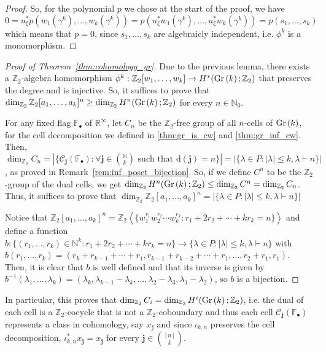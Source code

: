 \begin{proof}
So, for the polynomial $p$ we chose at the start of the proof, we have $0=u_{\xi}^*p(w_1(\gamma^k),\ldots,w_k(\gamma^k))=p(u^*_{\xi}w_1(\gamma^k),\ldots,u^*_{\xi}w_k(\gamma^k))=p(s_1,\ldots,s_k)$ which means that $p=0$, since $s_1,\ldots,s_k$ are algebraicly independent, i.e. $\phi^k$ is a monomorphism.
\end{proof}
\begin{proof}[Proof of Theorem~\ref{thm:cohomology_gr}] Due to the previous lemma, there exists a $\mathbb{Z}_2$-algebra homomorphism $\phi^k:\mathbb{Z}_2[w_1,\ldots,w_k]\to H^*(\Gr{k};\mathbb{Z}_2)$ that preserves the degree and is injective. So, it suffices to prove that $\dim_{\mathbb{Z}_2}\mathbb{Z}_2[a_1,\ldots,a_k]^n\geq\dim_{\mathbb{Z}_2}H^n(\Gr{k};\mathbb{Z}_2)$ for every $n\in\mathbb{N}_0$.

For any fixed flag $\mathbb{F}_{\bullet}$ of $\mathbb{R}^{\infty}$, let $C_n$ be the $\mathbb{Z}_2$-free group of all $n$-cells of $\Gr{k}$, for the cell decomposition we defined in \ref{thm:gr_is_cw} and \ref{thm:gr_inf_cw}. Then, $\dim_{\mathbb{Z}_2}C_n=|\{\mathcal{C}_{\mathbf{j}}(\mathbb{F}_{\bullet}):\forall\mathbf{j}\in\binom{\mathbb{N}}{k}\text{ such that }\mathrm{d}(\mathbf{j})=n\}|=|\{\lambda\in P:|\lambda|\leq k,\lambda\vdash n\}|$, as proved in Remark~\ref{rem:inf_poset_bijection}. So, if we define $C^n$ to be the $\mathbb{Z}_2$-group of the dual cells, we get $\dim_{\mathbb{Z}_2}H^n(\Gr{k};\mathbb{Z}_2)\leq\dim_{\mathbb{Z}_2}C^n=\dim_{\mathbb{Z}_2}C_n$. Thus, it suffices to prove that $\dim_{\mathbb{Z}_2}\mathbb{Z}_2[a_1,\ldots,a_k]^n=|\{\lambda\in P:|\lambda|\leq k,\lambda\vdash n\}|$

Notice that $\mathbb{Z}_2[a_1,\ldots,a_k]^n=\mathbb{Z}_2\left<\{w_1^{r_1}w_2^{r_2}\cdots w_k^{r_k}:r_1+2r_2+\cdots+kr_k=n\}\right>$ and define a function $b:\{(r_1,\ldots,r_k)\in\mathbb{N}^k:r_1+2r_2+\cdots+kr_k=n\}\to\{\lambda\in P:|\lambda|\leq k,\lambda\vdash n\}$ with $b(r_1,\ldots,r_k)=(r_k+r_{k-1}+\cdots+r_1,r_{k-1}+r_{k-2}+\cdots+r_1,\ldots,r_2+r_1,r_1)$. Then, it is clear that $b$ is well defined and that its inverse is given by $b^{-1}(\lambda_1,\ldots,\lambda_k)=(\lambda_k,\lambda_{k-1}-\lambda_k,\ldots,\lambda_2-\lambda_3,\lambda_1-\lambda_2)$, so $b$ is a bijection.
\end{proof}
\begin{remark}\label{rem:epimorphism} In particular, this proves that $\dim_{\mathbb{Z}_2}C_i=\dim_{\mathbb{Z}_2}H^i(\Gr{k};\mathbb{Z}_2)$, i.e. the dual of each cell is a $\mathbb{Z}_2$-cocycle that is not a $\mathbb{Z}_2$-coboundary and thus each cell $\mathcal{C}_{\mathbf{j}}(\mathbb{F}_{\bullet})$ represents a class in cohomology, say $x_{\mathbb{j}}$ and since $\iota_{k,n}$ preserves the cell decomposition, $\iota_{k,n}^*x_{\mathbf{j}}=x_{\mathbf{j}}$ for every $\mathbf{j}\in\binom{[n]}{k}$.
\end{remark}

